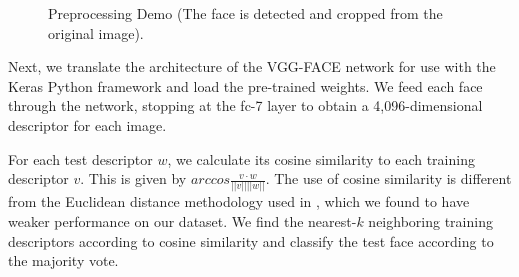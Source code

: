 \documentclass[pageno]{cos429}
\begin{document}
\begin{figure}[!htb]
\caption{Preprocessing Demo (The face is detected and cropped from the original image).}
\label{fig:vgg_preprocessing}

\end{figure} 

Next, we translate the architecture of the VGG-FACE network for use with the Keras Python framework and load the pre-trained weights. We feed each face through the network, stopping at the fc-7 layer to obtain a 4,096-dimensional descriptor for each image.

For each test descriptor $w$, we calculate its cosine similarity to each training descriptor $v$. This is given by $arccos\frac{v \cdot w}{||v|| ||w||}$. The use of cosine similarity is different from the Euclidean distance methodology used in \cite{parkhi_deep_2015}, which we found to have weaker performance on our dataset. We find the nearest-$k$ neighboring training descriptors according to cosine similarity and classify the test face according to the majority vote.
\end{document}
